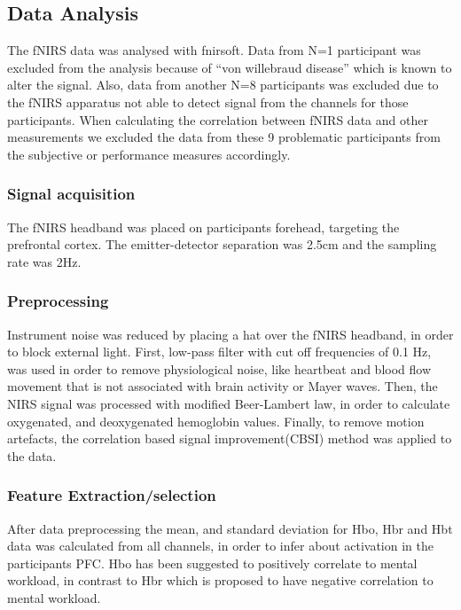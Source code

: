\documentclass[../main/Feedback.tex]{subfiles}
\begin{document}
\subsection{Data Analysis}
The fNIRS data was analysed with fnirsoft\cite{ayazfunctional}. Data from N=1 participant was excluded from the analysis because of ``von willebraud disease'' which is known to alter the signal. Also, data from another N=8 participants was excluded due to the fNIRS apparatus not able to detect signal from the channels for those participants. When calculating the correlation between fNIRS data and other measurements we excluded the data from these 9 problematic participants from the subjective or performance measures accordingly.
\subsubsection{Signal acquisition}
The fNIRS headband was placed on participants forehead, targeting the prefrontal cortex. The emitter-detector separation was 2.5cm and the sampling rate was 2Hz.
\subsubsection{Preprocessing}
Instrument noise was reduced by placing a hat over the fNIRS headband, in order to block external light.
First, low-pass filter with cut off frequencies of 0.1 Hz, was used in order to remove physiological noise, like heartbeat and blood flow movement that is not associated with brain activity or Mayer waves.
Then, the NIRS signal was processed with modified Beer-Lambert law\cite{cope1988system}, in order to calculate oxygenated, and deoxygenated hemoglobin values.
Finally, to remove motion artefacts, the correlation based signal improvement(CBSI)\cite{cui2010functional} method was applied to the data.
\subsubsection{Feature Extraction/selection}
After data preprocessing the mean, and standard deviation for Hbo, Hbr and Hbt data was calculated from all channels, in order to infer about activation in the participants PFC. Hbo has been suggested to positively correlate to mental workload, in contrast to Hbr which is proposed to have negative correlation to mental workload.\\
\end{document}
